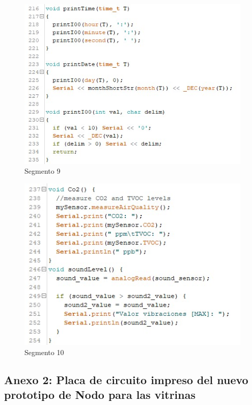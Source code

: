 \begin{flushleft}
    \begin{figure}[H]
        \includegraphics{imagenes/codigo9.jpg}
        \caption*{Segmento 9}
    \end{figure}

    \begin{figure}[H]
        \includegraphics{imagenes/codigo10.jpg}
        \caption*{Segmento 10}
    \end{figure}
\end{flushleft}

\subsection*{Anexo 2: Placa de circuito impreso del nuevo prototipo de Nodo para las vitrinas}\label{Anexo2}

